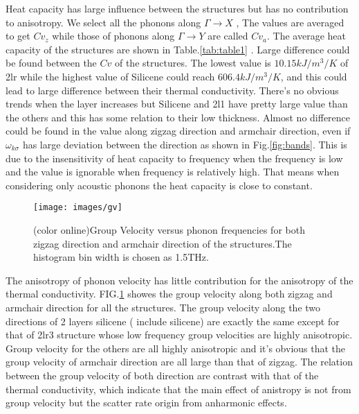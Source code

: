 \documentclass[%
 reprint,
 amsmath,amssymb,
 aps,
 prb,
]{revtex4-1}
\begin{document}
Heat capacity has large influence between the structures but has no contribution to anisotropy. We select all the phonons along  $\Gamma\rightarrow X$ ,
The values are averaged to get $Cv_z$ while those of phonons along $\Gamma\rightarrow Y$ are called $Cv_a$. The average heat capacity of the structures are shown in Table.\ref{tab:table1} . Large difference could be found between the $Cv$ of the structures. The lowest value is $10.15 kJ/m^3/K$ of 2lr while the highest value of Silicene could reach $606.4 kJ/m^3/K$, and this could lead to large difference between their thermal conductivity. There's no obvious trends when the layer increases but Silicene and 2l1 have pretty large value than the others and this has some relation to their low thickness.  Almost no difference could be found in the value along zigzag direction and armchair direction, even if $\omega_{k \sigma}$ has large deviation between the direction as shown in Fig.\ref{fig:bands}. This is due to the insensitivity of heat capacity to frequency when the frequency is low and the value is ignorable when frequency is relatively high. That means when considering only acoustic phonons the heat capacity is close to constant.


\begin{figure}[b]
  \texttt{[image: images/gv]}{}
  \caption{\label{fig:gv} (color online)Group Velocity versus phonon frequencies for both zigzag direction and armchair direction of the structures.The histogram bin width is chosen as 1.5THz.}
\end{figure}

The anisotropy of phonon velocity has little contribution for the anisotropy of the thermal conductivity. FIG.\ref{fig:gv} showes the group velocity along both zigzag and armchair direction for all the structures. The group velocity  along the two directions of  2 layers silicene ( include silicene) are exactly the same except for that of 2lr3 structure whose low frequency group velocities are highly anisotropic. Group velocity for the others are all highly anisotropic and it's obvious that the group velocity of armchair direction are all large than that of zigzag. The relation between the group velocity of both direction are contrast with that of the thermal conductivity, which indicate that the main effect of anistropy is not from group velocity but the scatter rate origin from anharmonic effects.
\end{document}
